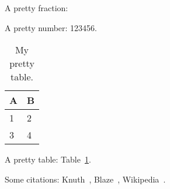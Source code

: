 \documentclass[11pt, letterpaper, twocolumn]{article}
\title{\mytitle}
\author{Me}
\begin{document}
  \maketitle

  A pretty fraction: 

  A pretty number: \num{123456}.

  \begin{table}[t]
    \centering
    \caption{My pretty table.}
    \label{tab:pretty}
    \begin{tabular}{ll}
      \toprule
      A & B \\
      \midrule
      1 & 2 \\
      3 & 4 \\
      \bottomrule
    \end{tabular}
  \end{table}

  A pretty table: Table~\ref{tab:pretty}.

  Some citations:
  Knuth~\cite{knuth-taocp-v1}, Blaze~\cite{blaze-cfs},
  Wikipedia~\cite{bhattacharyya}.

  \balance
  \printbibliography
\end{document}
